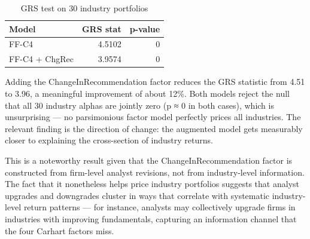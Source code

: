 \documentclass[
  letterpaper,
  DIV=11,
  numbers=noendperiod]{scrartcl}
\newenvironment{Shaded}{\begin{snugshade}}{\end{snugshade}}
\newcommand{\AttributeTok}[1]{\textcolor[rgb]{0.40,0.45,0.13}{#1}}
\newcommand{\CommentTok}[1]{\textcolor[rgb]{0.37,0.37,0.37}{#1}}
\newcommand{\DecValTok}[1]{\textcolor[rgb]{0.68,0.00,0.00}{#1}}
\newcommand{\FunctionTok}[1]{\textcolor[rgb]{0.28,0.35,0.67}{#1}}
\newcommand{\NormalTok}[1]{\textcolor[rgb]{0.00,0.23,0.31}{#1}}
\newcommand{\OtherTok}[1]{\textcolor[rgb]{0.00,0.23,0.31}{#1}}
\newcommand{\SpecialCharTok}[1]{\textcolor[rgb]{0.37,0.37,0.37}{#1}}
\newcommand{\StringTok}[1]{\textcolor[rgb]{0.13,0.47,0.30}{#1}}
\begin{document}
\begin{Shaded}
\end{Shaded}

\begin{longtable}[t]{lrr}
\caption{\label{tab:grs-test}GRS test on 30 industry portfolios}\\
\toprule
Model & GRS stat & p-value\\
\midrule
FF-C4 & 4.5102 & 0\\
FF-C4 + ChgRec & 3.9574 & 0\\
\bottomrule
\end{longtable}

Adding the ChangeInRecommendation factor reduces the GRS statistic from
4.51 to 3.96, a meaningful improvement of about 12\%. Both models reject
the null that all 30 industry alphas are jointly zero (p ≈ 0 in both
cases), which is unsurprising --- no parsimonious factor model perfectly
prices all industries. The relevant finding is the direction of change:
the augmented model gets measurably closer to explaining the
cross-section of industry returns.

This is a noteworthy result given that the ChangeInRecommendation factor
is constructed from firm-level analyst revisions, not from
industry-level information. The fact that it nonetheless helps price
industry portfolios suggests that analyst upgrades and downgrades
cluster in ways that correlate with systematic industry-level return
patterns --- for instance, analysts may collectively upgrade firms in
industries with improving fundamentals, capturing an information channel
that the four Carhart factors miss.
\end{document}
